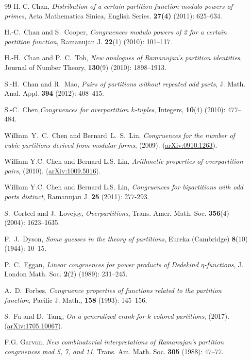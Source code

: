 \documentclass[12pt]{amsart}
\numberwithin{equation}{section}
\theoremstyle{plain}
\theoremstyle{definition}
\begin{document}
\begin{thebibliography}{99}
H.-C. Chan, \emph{Distribution of a certain partition function modulo powers of primes}, Acta Mathematica Sinica, English Series. \textbf{27(4)} (2011): 625--634.

H.-C.~Chan and S.~Cooper, \emph{Congruences modulo powers of 2 for a certain partition function}, Ramanujan J. \textbf{22}(1) (2010): 101--117.

H.-H.~Chan and P.~C.~Toh, \emph{New analogues of Ramanujan's partition identities}, Journal of Number Theory, {\bf 130}(9) (2010): 1898--1913.

S.-H.~Chan and R.~Mao, \emph{Pairs of partitions without repeated odd parts}, J. Math. Anal. Appl. \textbf{394} (2012): 408--415.

S.-C.~Chen,\emph{Congruences for overpartition $k$-tuples}, Integers, {\bf 10}(4) (2010): 477--484.

William~Y.~C.~Chen and Bernard~L.~S.~Lin, \emph{Congruences for the number of cubic partitions derived from modular forms}, (2009). (\href{http://arxiv.org/abs/0910.1263}{arXiv:0910.1263}).

William Y.C. Chen and Bernard L.S. Lin, \emph{Arithmetic properties of overpartition pairs}, (2010). (\href{http://arxiv.org/abs/1009.5016}{arXiv:1009.5016}).

William Y.C. Chen and Bernard L.S. Lin, \emph{Congruences for bipartitions with odd parts distinct}, Ramanujan J. \textbf{25} (2011): 277-293.

S.~Corteel and J.~Lovejoy, \emph{Overpartitions}, Trans. Amer. Math. Soc. {\bf 356}(4) (2004): 1623--1635.

F.~J.~Dyson, \emph{Some guesses in the theory of partitions}, Eureka (Cambridge) {\bf 8}(10) (1944): 10--15.

P.~C.~Eggan, \emph{Linear congruences for power products of Dedekind $\eta$-functions}, J. London Math. Soc. {\bf 2}(2) (1989): 231--245.

A.~D.~Forbes, \emph{Congruence properties of functions related to the partition function}, Pacific J. Math., {\bf 158} (1993): 145--156.

S.~Fu and D.~Tang, \emph{On a generalized crank for $k$-colored partitions}, (2017). (\href{http://arxiv.org/abs/1705.10067}{arXiv:1705.10067}).

F.G. Garvan, \emph{New combinatorial interpretations of Ramanujan's partition congruences mod 5, 7, and 11}, Trans. Am. Math. Soc. \textbf{305} (1988): 47--77.


\end{thebibliography}
\end{document}
